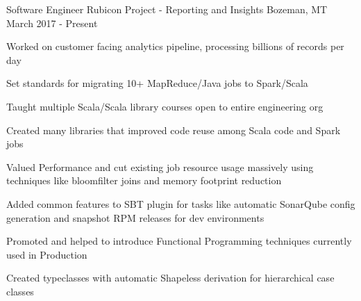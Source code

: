 

\begin{cventries}

  \cventry
    {Software Engineer} %
    {Rubicon Project - Reporting and Insights} %
    {Bozeman, MT} %
    {March 2017 - Present} %
    {
      \begin{cvitems} %
        \item{Worked on customer facing analytics pipeline, processing billions of records per day}
        \item{Set standards for migrating 10+ MapReduce/Java jobs to Spark/Scala}
        \item{Taught multiple Scala/Scala library courses open to entire engineering org}
        \item{Created many libraries that improved code reuse among Scala code and Spark jobs}
        \item{Valued Performance and cut existing job resource usage massively using techniques like bloomfilter joins and memory footprint reduction}
        \item{Added common features to SBT plugin for tasks like automatic SonarQube config generation and snapshot RPM releases for dev environments}
        \item{Promoted and helped to introduce Functional Programming techniques currently used in Production}
        \item{Created typeclasses with automatic Shapeless derivation for hierarchical case classes}
      \end{cvitems}
    }



\end{cventries}
